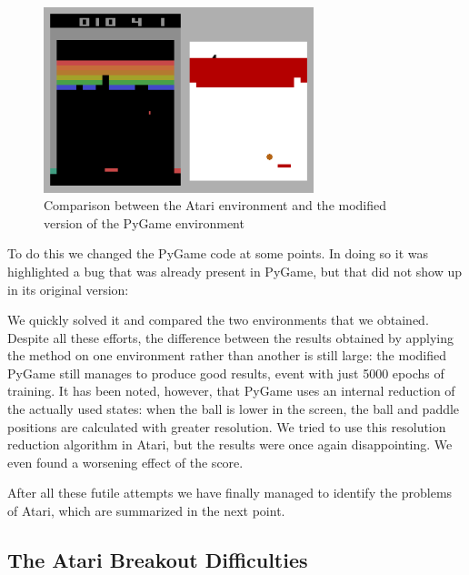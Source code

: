 \begin{figure}
    \centering
    \includegraphics[width=0.7\textwidth]{images/modified-pygame-comparison.png}
    \caption{Comparison between the Atari environment and the modified version of the PyGame environment}
\end{figure}

To do this we changed the PyGame code at some points. In doing so it was highlighted a bug that was already present in PyGame, but that did not show up in its original version:



We quickly solved it and compared the two environments that we obtained. Despite all these efforts, the difference between the results obtained by applying the method on one environment rather than another is still large: the modified PyGame still manages to produce good results, event with just 5000 epochs of training. It has been noted, however, that PyGame uses an internal reduction of the actually used states: when the ball is lower in the screen, the ball and paddle positions are calculated with greater resolution. We tried to use this resolution reduction algorithm in Atari, but the results were once again disappointing. We even found a worsening effect of the score.



After all these futile attempts we have finally managed to identify the problems of Atari, which are summarized in the next point.

\subsection{The Atari Breakout Difficulties}

